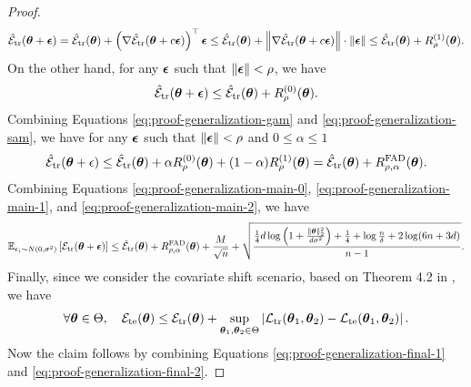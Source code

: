\begin{proof}
    \begin{equation} \label{eq:proof-generalization-gam}
        \hat{\mathcal{E}}_{{\text{tr}}}(\boldsymbol{\theta} + \boldsymbol{\epsilon}) = \hat{\mathcal{E}}_{{\text{tr}}}(\boldsymbol{\theta}) + \left(\nabla \hat{\mathcal{E}}_{{\text{tr}}}(\boldsymbol{\theta} + c \boldsymbol{\epsilon})\right)^\top\boldsymbol{\epsilon} \le \hat{\mathcal{E}}_{{\text{tr}}}(\boldsymbol{\theta}) + \left\|\nabla \hat{\mathcal{E}}_{{\text{tr}}}(\boldsymbol{\theta} + c \boldsymbol{\epsilon})\right\|\cdot\|\boldsymbol{\epsilon}\| \le \hat{\mathcal{E}}_{{\text{tr}}}(\boldsymbol{\theta}) + R^{(1)}_{\rho}(\boldsymbol{\theta}).
    \end{equation}
    On the other hand, for any $\boldsymbol{\epsilon}$ such that $\|\boldsymbol{\epsilon}\| < \rho$, we have
    \begin{equation} \label{eq:proof-generalization-sam}
        \hat{\mathcal{E}}_{{\text{tr}}}(\boldsymbol{\theta} + \boldsymbol{\epsilon}) \le \hat{\mathcal{E}}_{{\text{tr}}}(\boldsymbol{\theta}) + R^{(0)}_{\rho}(\boldsymbol{\theta}).
    \end{equation}
    Combining Equations \eqref{eq:proof-generalization-gam} and \eqref{eq:proof-generalization-sam}, we have for any $\boldsymbol{\epsilon}$ such that $\|\boldsymbol{\epsilon}\| < \rho$ and $0 \le \alpha \le 1$
    \begin{equation} \label{eq:proof-generalization-main-2}
        \hat{\mathcal{E}}_{{\text{tr}}}(\boldsymbol{\theta} + \epsilon) \le \hat{\mathcal{E}}_{{\text{tr}}}(\boldsymbol{\theta}) + \alpha R^{(0)}_{\rho}(\boldsymbol{\theta}) + (1 - \alpha) R^{(1)}_{\rho}(\boldsymbol{\theta}) = \hat{\mathcal{E}}_{{\text{tr}}}(\boldsymbol{\theta}) + R^{\text{FAD}}_{\rho, \alpha}(\boldsymbol{\theta}).
    \end{equation}
    Combining Equations \eqref{eq:proof-generalization-main-0}, \eqref{eq:proof-generalization-main-1}, and \eqref{eq:proof-generalization-main-2}, we have
    \begin{equation} \label{eq:proof-generalization-final-1}
        \mathbb{E}_{\epsilon_i \sim N(0, \sigma^2)}\left[\mathcal{E}_{{\text{tr}}}(\boldsymbol{\theta}+\boldsymbol{\epsilon})\right] \leq \hat{\mathcal{E}}_{{\text{tr}}}(\boldsymbol{\theta}) + R^{\text{FAD}}_{\rho, \alpha}(\boldsymbol{\theta}) + \frac{M}{\sqrt{n}} + \sqrt{\frac{\frac{1}{4} d \log \left(1+\frac{\|\boldsymbol{\theta}\|_2^2}{d \sigma^2}\right)+\frac{1}{4}+\log \frac{n}{\delta}+2 \log (6 n+3 d)}{n-1}}.
    \end{equation}
    Finally, since we consider the covariate shift scenario, based on Theorem 4.2 in \cite{zhang2022nico++}, we have
    \begin{equation} \label{eq:proof-generalization-final-2}
        \forall \boldsymbol{\theta} \in \Theta, \quad \mathcal{E}_{{\text{te}}}(\boldsymbol{\theta}) \le \mathcal{E}_{{\text{tr}}}(\boldsymbol{\theta}) +  \sup_{\boldsymbol{\theta}_1, \boldsymbol{\theta}_2 \in \Theta}\left|\mathcal{L}_{{\text{tr}}}(\boldsymbol{\theta}_1, \boldsymbol{\theta}_2) - \mathcal{L}_{{\text{te}}}(\boldsymbol{\theta}_1, \boldsymbol{\theta}_2)\right|.
    \end{equation}
    Now the claim follows by combining Equations \eqref{eq:proof-generalization-final-1} and \eqref{eq:proof-generalization-final-2}.
\end{proof}

